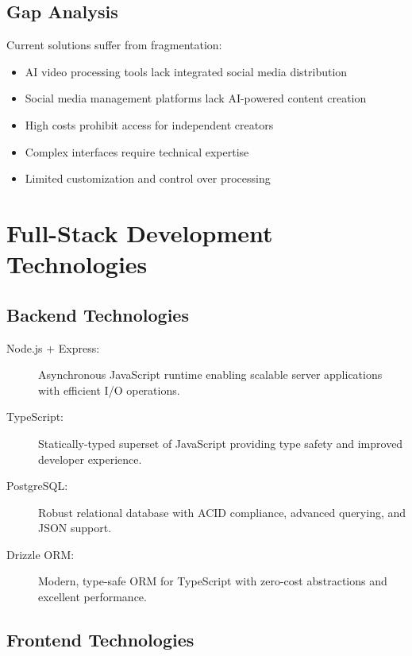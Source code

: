 \subsection{Gap Analysis}

Current solutions suffer from fragmentation:
\begin{itemize}
    \item AI video processing tools lack integrated social media distribution
    \item Social media management platforms lack AI-powered content creation
    \item High costs prohibit access for independent creators
    \item Complex interfaces require technical expertise
    \item Limited customization and control over processing
\end{itemize}

\section{Full-Stack Development Technologies}

\subsection{Backend Technologies}

\begin{description}
    \item[Node.js + Express:] Asynchronous JavaScript runtime enabling scalable server applications with efficient I/O operations.
    
    \item[TypeScript:] Statically-typed superset of JavaScript providing type safety and improved developer experience.
    
    \item[PostgreSQL:] Robust relational database with ACID compliance, advanced querying, and JSON support.
    
    \item[Drizzle ORM:] Modern, type-safe ORM for TypeScript with zero-cost abstractions and excellent performance.
\end{description}

\subsection{Frontend Technologies}

